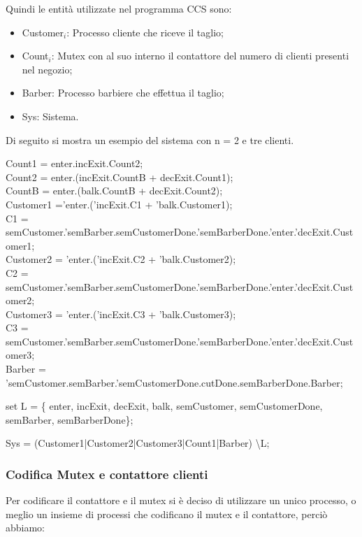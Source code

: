 Quindi le entità utilizzate nel programma CCS sono:
\begin{itemize}
	\item Customer$_{i}$: Processo cliente che riceve il taglio;
	\item Count$_{i}$: Mutex con al suo interno il contattore del numero di clienti presenti nel negozio;
	\item Barber: Processo barbiere che effettua il taglio;
	\item Sys: Sistema.
\end{itemize}

Di seguito si mostra un esempio del sistema con n = 2 e tre clienti.

Count1 = enter.incExit.Count2;\\
Count2 = enter.(incExit.CountB + decExit.Count1);\\
CountB = enter.(balk.CountB + decExit.Count2);\\

Customer1 ='enter.('incExit.C1 + 'balk.Customer1);\\
C1 = semCustomer.'semBarber.semCustomerDone.'semBarberDone.'enter.'decExit.Customer1;\\

Customer2 = 'enter.('incExit.C2 + 'balk.Customer2);\\
C2 = semCustomer.'semBarber.semCustomerDone.'semBarberDone.'enter.'decExit.Customer2;\\

Customer3 = 'enter.('incExit.C3 + 'balk.Customer3);\\
C3 = semCustomer.'semBarber.semCustomerDone.'semBarberDone.'enter.'decExit.Customer3;\\

Barber = 'semCustomer.semBarber.'semCustomerDone.cutDone.semBarberDone.Barber;

set L = \{ enter, incExit, decExit, balk, semCustomer, semCustomerDone, semBarber, semBarberDone\};

Sys = (Customer1|Customer2|Customer3|Count1|Barber) \textbackslash L;\\

\subsubsection{Codifica Mutex e contattore clienti}

Per codificare il contattore e il mutex si è deciso di utilizzare un unico processo, o meglio un insieme di processi che codificano il mutex e il contattore, perciò abbiamo: 

